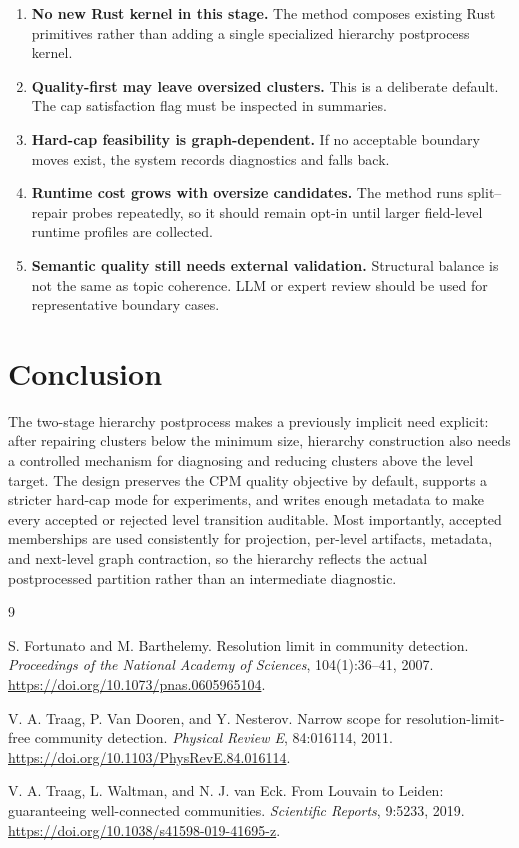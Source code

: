 \documentclass[11pt,a4paper]{article}
\begin{document}
\begin{enumerate}[nosep]
    \item \textbf{No new Rust kernel in this stage.} The method composes
          existing Rust primitives rather than adding a single specialized
          hierarchy postprocess kernel.
    \item \textbf{Quality-first may leave oversized clusters.} This is a
          deliberate default. The cap satisfaction flag must be inspected in
          summaries.
    \item \textbf{Hard-cap feasibility is graph-dependent.} If no acceptable
          boundary moves exist, the system records diagnostics and falls back.
    \item \textbf{Runtime cost grows with oversize candidates.} The method
          runs split--repair probes repeatedly, so it should remain opt-in
          until larger field-level runtime profiles are collected.
    \item \textbf{Semantic quality still needs external validation.} Structural
          balance is not the same as topic coherence. LLM or expert review
          should be used for representative boundary cases.
\end{enumerate}

\section{Conclusion}

The two-stage hierarchy postprocess makes a previously implicit need explicit:
after repairing clusters below the minimum size, hierarchy construction also
needs a controlled mechanism for diagnosing and reducing clusters above the
level target. The design preserves the CPM quality objective by default,
supports a stricter hard-cap mode for experiments, and writes enough metadata
to make every accepted or rejected level transition auditable. Most
importantly, accepted memberships are used consistently for projection,
per-level artifacts, metadata, and next-level graph contraction, so the
hierarchy reflects the actual postprocessed partition rather than an
intermediate diagnostic.

\begin{thebibliography}{9}

S. Fortunato and M. Barthelemy.
\newblock Resolution limit in community detection.
\newblock \emph{Proceedings of the National Academy of Sciences}, 104(1):36--41, 2007.
\newblock \url{https://doi.org/10.1073/pnas.0605965104}.

V. A. Traag, P. Van Dooren, and Y. Nesterov.
\newblock Narrow scope for resolution-limit-free community detection.
\newblock \emph{Physical Review E}, 84:016114, 2011.
\newblock \url{https://doi.org/10.1103/PhysRevE.84.016114}.

V. A. Traag, L. Waltman, and N. J. van Eck.
\newblock From Louvain to Leiden: guaranteeing well-connected communities.
\newblock \emph{Scientific Reports}, 9:5233, 2019.
\newblock \url{https://doi.org/10.1038/s41598-019-41695-z}.

\end{thebibliography}
\end{document}
